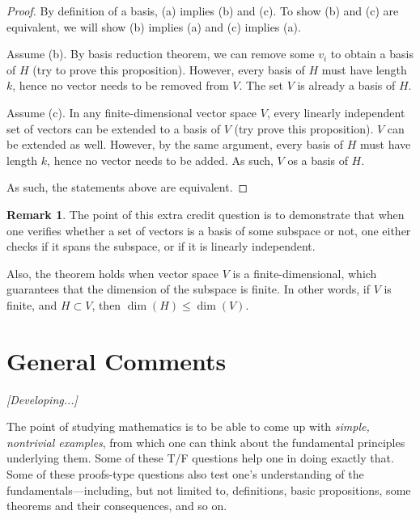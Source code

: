 \documentclass{amsart}
\theoremstyle{definition}
\newtheorem{remark}[definition]{Remark}
\theoremstyle{definition}
\DeclareMathOperator{\1}{\mathbbm{1}}
\renewcommand{\leq}{\leqslant}
\begin{document}
\begin{enumerate}[itemsep = 2mm]
		\begin{proof}
			By definition of a basis, (a) implies (b) and (c). To show (b) and (c) are equivalent, we will show (b) implies (a) and (c) implies (a).
			
			Assume (b). By basis reduction theorem, we can remove some $v_i$ to obtain a basis of $H$ (try to prove this proposition). However, every basis of $H$ must have length $k$, hence no vector needs to be removed from $V$. The set $V$ is already a basis of $H$.
			
			Assume (c). In any finite-dimensional vector space $V$, every linearly independent set of vectors can be extended to a basis of $V$ (try prove this proposition). $V$ can be extended as well. However, by the same argument, every basis of $H$ must have length $k$, hence no vector needs to be added. As such, $V$ os a basis of $H$.
			
			As such, the statements above are equivalent.
		\end{proof}
	
		\begin{remark}
			The point of this extra credit question is to demonstrate that when one verifies whether a set of vectors is a basis of some subspace or not, one either checks if it spans the subspace, or if it is linearly independent. 
			
			Also, the theorem holds when vector space $V$ is a finite-dimensional, which guarantees that the dimension of the subspace is finite. In other words, if $V$ is finite, and $H \subset V$, then $\dim(H) \leq \dim(V)$.
		\end{remark}
	\end{enumerate}
	
	
	\clearpage
	
	
\section*{General Comments}

\noindent \textit{[Developing...]}

The point of studying mathematics is to be able to come up with \textit{simple, nontrivial examples}, from which one can think about the fundamental principles underlying them. Some of these T/F questions help one in doing exactly that. Some of these proofs-type questions also test one's understanding of the fundamentals---including, but not limited to, definitions, basic propositions, some theorems and their consequences, and so on.
\end{document}
